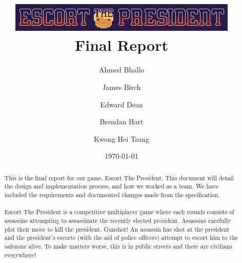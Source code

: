 \documentclass[12pt]{article}
\title{\includegraphics[scale=1]{final-report-logo}\\
\Huge\textbf{Final Report}}
\author{Ahmed Bhallo \and James Birch \and Edward Dean \and Brendan Hart \and Kwong Hei Tsang}
\date{\today}
\newcommand{\return}{\\\\\noindent}
\begin{document}
\maketitle

\begin{abstract}
This is the final report for our game, Escort The President. This document will detail the design and implementation process, and how we worked as a team. We have included the requirements and documented changes made from the specification.\return
Escort The President is a competitive multiplayer game where each rounds consists of assassins attempting to assassinate the recently elected president. Assassins carefully plot their move to kill the president. Gunshot! An assassin has shot at the president and the president's escorts (with the aid of police officers) attempt to escort him to the safezone alive. To make matters worse, this is in public streets and there are civilians everywhere! 
\end{abstract}

\newpage
\pagestyle{fancy}
\tableofcontents
\newpage
\end{document}
